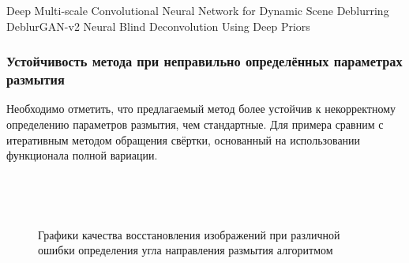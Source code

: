 Deep Multi-scale Convolutional Neural Network for Dynamic Scene Deblurring
DeblurGAN-v2
Neural Blind Deconvolution Using Deep Priors 

\subsubsection{Устойчивость метода при неправильно определённых параметрах размытия}

Необходимо отметить, что предлагаемый метод более устойчив к некорректному определению параметров размытия, чем стандартные. Для примера сравним с итеративным методом обращения свёртки, основанный на использовании функционала полной вариации. 

\begin{figure}[H]
\begin{minipage}[8]{1\linewidth}
\\ 
\end{minipage}
    \vfill
\begin{minipage}[8]{1\linewidth}
\\
\end{minipage}
\caption{ Графики качества восстановления изображений при различной ошибки определения угла направления размытия алгоритмом }
\label{ris:plots_a}
\end{figure}

